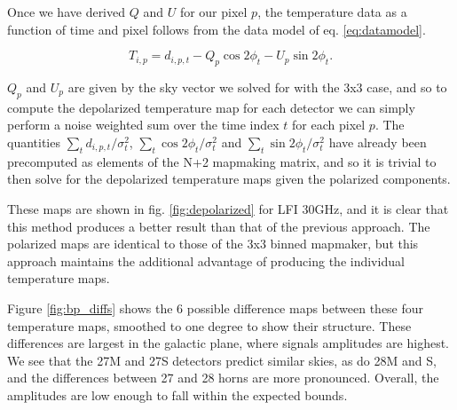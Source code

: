 \documentclass{aa}
\begin{document}
Once we have derived $Q$ and $U$ for our pixel $p$, the temperature data as a function of time and pixel follows from the data model of eq. \ref{eq:datamodel}. 

\begin{equation}
T_{i,p} = d_{i,p,t} - Q_p \cos2\phi_t - U_p \sin2\phi_t.
\end{equation}


$Q_p$ and $U_p$ are given by the sky vector we solved for with the 3x3 case, and so to compute the depolarized temperature map for each detector we can simply perform a noise weighted sum over the time index $t$ for each pixel $p$. The quantities $\sum_t d_{i,p,t}/\sigma_t^2$, $\sum_t \cos2\phi_t/\sigma_t^2$ and $\sum_t \sin2\phi_t/\sigma_t^2$ have already been precomputed as elements of the N+2 mapmaking matrix, and so it is trivial to then solve for the depolarized temperature maps given the polarized components. 

These maps are shown in fig. \ref{fig:depolarized} for LFI 30GHz, and it is clear that this method produces a better result than that of the previous approach. The polarized maps are identical to those of the 3x3 binned mapmaker, but this approach maintains the additional advantage of producing the individual temperature maps.

Figure \ref{fig:bp_diffs} shows the 6 possible difference maps between these four temperature maps, smoothed to one degree to show their structure. These differences are largest in the galactic plane, where signals amplitudes are highest. We see that the 27M and 27S detectors predict similar skies, as do 28M and S, and the differences between 27 and 28 horns are more pronounced. Overall, the amplitudes are low enough to fall within the expected bounds.
\end{document}
